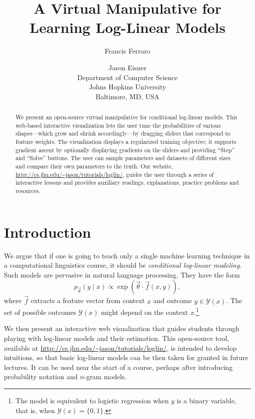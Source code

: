 \documentclass[11pt,letterpaper]{article}
\title{A Virtual Manipulative for Learning Log-Linear Models}
\author{
Francis Ferraro \and Jason Eisner\\
Department of Computer Science\\
Johns Hopkins University\\
Baltimore, MD, USA
}
\date{}
\newcommand{\WhereToFind}[0]{\url{http://cs.jhu.edu/~jason/tutorials/loglin/}}
\begin{document}
\maketitle

\begin{abstract}
  We present an open-source virtual manipulative for conditional
  log-linear models. This web-based interactive visualization lets
  the user tune the probabilities of various shapes---which grow and
  shrink accordingly---by dragging sliders that correspond to feature
  weights.  The visualization displays a regularized training
  objective; it supports gradient ascent by optionally displaying
  gradients on the sliders and providing ``Step'' and ``Solve''
  buttons.  The user can sample parameters and datasets of
  different sizes and compare their own parameters to the truth.  Our
  website, \WhereToFind{}, guides the user through a series of
  interactive lessons and provides auxiliary readings, explanations, 
practice problems and resources.
\end{abstract}

\section{Introduction}\label{sec:intro}
We argue that if one is going to teach only a single machine learning
technique in a computational linguistics course, it should be {\em
  conditional log-linear modeling}.  Such models are pervasive in
natural language processing.  They have the form
\begin{equation}\label{eqn:loglin}
p_{\vec{\theta}}(y \mid x) \propto \exp{\left(\vec{\theta} \cdot \vec{f}\left(x,y\right)\right)},
\end{equation}
where $\vec{f}$ extracts a feature vector from context $x$ and
outcome $y \in \mathcal{Y}(x)$.  The set of possible
outcomes $\mathcal{Y}(x)$ might depend on the context
$x$.\footnote{The model is equivalent to logistic regression
  when $y$ is a binary variable, that is, when $\mathcal{Y}(x)=\{0,1\}$.}

We then present an interactive web visualization that guides students
through playing with log-linear models and their estimation. This open-source 
tool, available at \WhereToFind{}, is intended to develop intuitions, so that basic
log-linear models can be then taken for granted in future lectures.  It can be used near
the start of a course, perhaps after introducing probability notation
and $n$-gram models.
\end{document}
